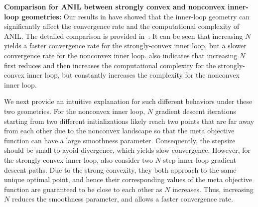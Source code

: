 \documentclass{osudissert96}
\begin{document}
{\noindent \bf Comparison for ANIL between strongly convex and nonconvex inner-loop  geometries:} 
Our results in  have showed that the inner-loop geometry can significantly affect the convergence rate and the computational complexity of ANIL. The detailed comparison is provided in~. It can be seen that increasing $N$ yields a faster convergence rate  for the strongly-convex inner loop, but a slower convergence rate for the nonconvex inner loop.  also indicates that increasing $N$ first reduces and then increases the computational complexity for the strongly-convex inner loop, but constantly increases the complexity for the nonconvex inner loop. 
 



We next provide an intuitive explanation for such different behaviors under these two geometries. For the nonconvex inner loop, $N$ gradient descent iterations starting from two different initializations  likely reach two points that are far away from each other due to the nonconvex landscape so that  the meta objective function can have a large smoothness parameter. Consequently, the stepsize should be small to avoid divergence, which yields slow convergence.
However, for the strongly-convex inner loop, also consider two $N$-step inner-loop gradient descent paths. Due to the strong convexity, they both approach to the same unique optimal point, and hence their corresponding values of the meta objective function are guaranteed to be close to each other as $N$ increases. Thus, increasing $N$ reduces the smoothness parameter, and allows a faster convergence rate. 
\end{document}

